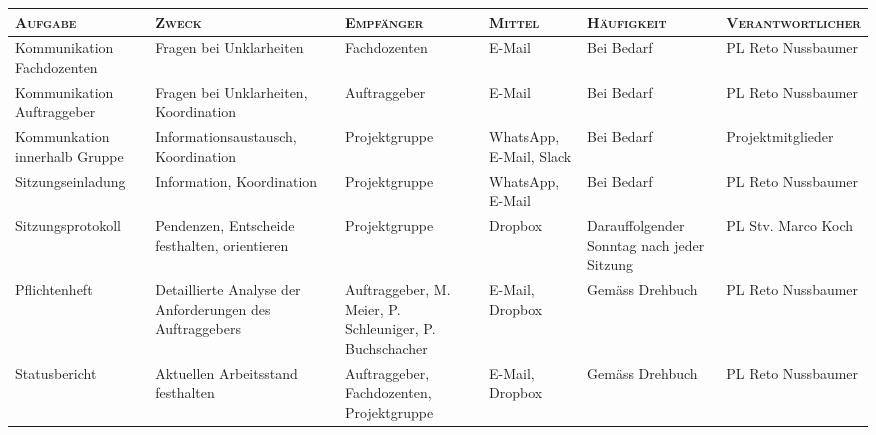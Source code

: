 
\vspace*{-10mm}

\begin{table}[!h]
    \begin{longtable}{p{3.5cm}p{3.5cm}p{3.5cm}p{3.5cm}p{3.5cm}p{4cm}}
    \toprule

    \large{\textsc{Aufgabe}}
    & \large{\textsc{Zweck}}
    & \large{\textsc{Empf\"anger}}
    & \large{\textsc{Mittel}}
    & \large{\textsc{H\"aufigkeit}}
    & \large{\textsc{Verantwortlicher}} \\

    \midrule
    \endhead
    \midrule
    \endfoot
    \bottomrule
    \endlastfoot


    Kommunikation Fachdozenten
    & Fragen bei Unklarheiten
    & Fachdozenten
    & E-Mail
    & Bei Bedarf
    & PL Reto Nussbaumer \\
    [2mm]

    Kommunikation Auftraggeber
    & Fragen bei Unklarheiten, Koordination
    & Auftraggeber
    & E-Mail
    & Bei Bedarf
    & PL Reto Nussbaumer \\
    [2mm]

    Kommunkation innerhalb Gruppe
    & Informationsaustausch, Koordination
    & Projektgruppe
    & WhatsApp, E-Mail, Slack
    & Bei Bedarf
    & Projektmitglieder \\
    [2mm]

    Sitzungseinladung
    & Information, Koordination
    & Projektgruppe
    & WhatsApp, E-Mail
    & Bei Bedarf
    & PL Reto Nussbaumer \\
    [2mm]

    Sitzungsprotokoll
    & Pendenzen, Entscheide festhalten, orientieren
    & Projektgruppe
    & Dropbox
    & Darauffolgender Sonntag nach jeder Sitzung
    & PL Stv. Marco Koch \\
    [2mm]

    Pflichtenheft
    & Detaillierte Analyse der Anforderungen des Auftraggebers
    & Auftraggeber, M. Meier, P. Schleuniger, P. Buchschacher
    & E-Mail, Dropbox
    & Gem\"ass Drehbuch
    & PL Reto Nussbaumer \\
    [2mm]

    Statusbericht
    & Aktuellen Arbeitsstand festhalten
    & Auftraggeber, Fachdozenten, Projektgruppe
    & E-Mail, Dropbox
    & Gem\"ass Drehbuch
    & PL Reto Nussbaumer \\
    [2mm]


\end{longtable}
\end{table}
